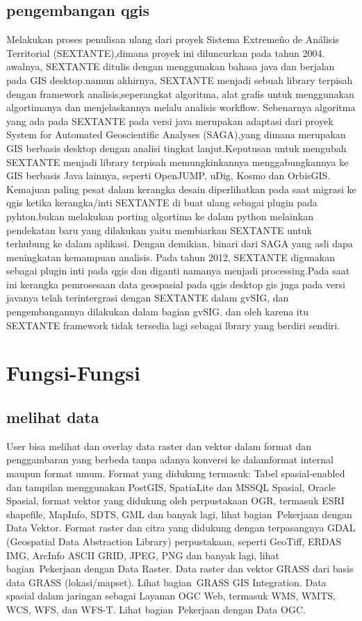 	 \subsection{pengembangan qgis}
		Melakukan proses penulisan ulang dari proyek Sistema Extremeño de Análisis Territorial (SEXTANTE),dimana proyek ini diluncurkan pada tahun 2004. awalnya, SEXTANTE ditulis dengan menggunakan bahasa java dan berjalan pada GIS desktop.namun akhirnya, SEXTANTE menjadi sebuah library terpisah dengan framework analisis,seperangkat algoritma, alat grafis untuk menggunakan algortimanya dan menjelaskannya melalu analisis workflow.
	 Sebenarnya algoritma yang ada pada SEXTANTE pada versi java merupakan adaptasi dari proyek System for Automated Geoscientific Analyses (SAGA),yang dimana merupakan GIS berbasis desktop dengan analisi tingkat lanjut.Keputusan untuk mengubah SEXTANTE menjadi library terpisah memungkinkannya menggabungkannya ke GIS berbasis Java lainnya, seperti OpenJUMP, uDig, Kosmo dan OrbisGIS.
	 Kemajuan paling pesat dalam kerangka desain diperlihatkan pada saat migrasi ke qgis ketika kerangka/inti SEXTANTE di buat ulang sebagai plugin pada pyhton.bukan melakukan porting algortima ke dalam python melainkan pendekatan baru yang dilakukan yaitu membiarkan SEXTANTE untuk terhubung ke dalam aplikasi. Dengan demikian, binari dari SAGA yang asli dapa meningkatan kemampuan analisis.
	 Pada tahun 2012, SEXTANTE digunakan sebagai plugin inti pada qgis dan diganti namanya menjadi processing\cite{graser2015processing}.Pada saat ini kerangka pemrosesaan data geospasial pada qgis desktop gis juga pada versi javanya telah terintergrasi dengan SEXTANTE dalam gvSIG, dan pengembangannya dilakukan dalam bagian gvSIG. dan oleh karena itu SEXTANTE framework tidak tersedia lagi sebagai lbrary yang berdiri sendiri.

\section{Fungsi-Fungsi}
	\subsection{melihat data}
	User bisa melihat dan overlay data raster dan vektor dalam format dan penggambaran yang berbeda tanpa adanya konversi ke dalamformat internal maupun format umum. Format yang didukung termasuk:
	Tabel spasial-enabled dan tampilan menggunakan PostGIS, SpatiaLite dan MSSQL Spasial, Oracle Spasial, format vektor yang didukung oleh perpustakaan OGR, termasuk ESRI shapefile, MapInfo, SDTS, GML dan banyak lagi, lihat bagian Pekerjaan dengan Data Vektor.
	Format raster dan citra yang didukung dengan terpasangnya GDAL (Geospatial Data Abstraction Library) perpustakaan, seperti GeoTiff, ERDAS IMG, ArcInfo ASCII GRID, JPEG, PNG dan banyak lagi, lihat bagian Pekerjaan dengan Data Raster.
	Data raster dan vektor GRASS dari basis data GRASS (lokasi/mapset). Lihat bagian GRASS GIS Integration.
	Data spasial dalam jaringan sebagai Layanan OGC Web, termasuk WMS, WMTS, WCS, WFS, dan WFS-T. Lihat bagian Pekerjaan dengan Data OGC.
